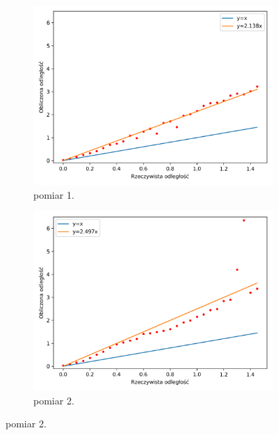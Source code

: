 \begin{figure}[H]
    \centering
    \begin{subfigure}{0.5\textwidth}
        \centering
        \includegraphics[width=\textwidth]{pics/mic_sync_dist/dists_close_long_0_mean.png}
        \caption{pomiar 1.}
        \label{pic:slope_test_mean_0}
    \end{subfigure}%
    \begin{subfigure}{0.5\textwidth}
        \centering
        \includegraphics[width=\textwidth]{pics/mic_sync_dist/dists_close_long_1_mean.png}
        \caption{pomiar 2.}
        \label{pic:slope_test_mean_1}
    \end{subfigure}
\end{figure}
